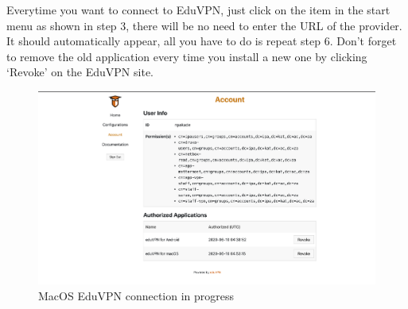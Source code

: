 Everytime you want to connect to EduVPN, just click on the item in the start menu as shown in step 3, there will be no need to  enter the URL of the provider. It should automatically appear, all you have to do is repeat step 6.
Don’t forget to remove the old application every time you install a new one by clicking ‘Revoke’ on the EduVPN site. 
\begin{figure}[!thb]
	\centering
	\includegraphics[scale=0.3]{Chapters/images/image32.png}
	
	\caption{MacOS EduVPN connection in progress }
	\label{fig:image32}
\end{figure}
